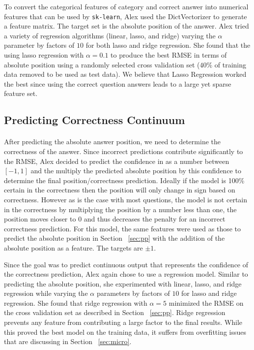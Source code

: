 \documentclass[letterpaper]{article}
\begin{document}
To convert the categorical features of category and correct answer into numerical features that can be used by \lstinline{sk-learn}, Alex used the DictVectorizer to generate a feature matrix.  The target set is the absolute position of the answer.  Alex tried a variety of regression algorithms (linear, lasso, and ridge) varying the $\alpha$ parameter by factors of $10$ for both lasso and ridge regression.  She found that the using lasso regression with $\alpha=0.1$ to produce the best RMSE in terms of absolute position using a randomly selected cross validation set ($40\%$ of training data removed to be used as test data).  We believe that Lasso Regression worked the best since using the correct question answers leads to a large yet sparse feature set.

\subsection{Predicting Correctness Continuum}
\label{sec:pc}
\paragraph{} After predicting the absolute answer position, we need to determine the correctness of the answer.  Since incorrect predictions contribute significantly to the RMSE, Alex decided to predict the confidence in as a number between $[-1,1]$ and the multiply the predicted absolute position by this confidence to determine the final position/correctness prediction.  Ideally if the model is 100\% certain in the correctness then the position will only change in sign based on correctness.  However as is the case with most questions, the model is not certain in the correctness by multiplying the position by a number less than one, the position moves closer to 0 and thus decreases the penalty for an incorrect correctness prediction.  For this model, the same features were used as those to predict the absolute position in Section ~\ref{sec:pp} with the addition of the absolute position as a feature.  The targets are $\pm 1$.

Since the goal was to predict continuous output that represents the confidence of the correctness prediction, Alex again chose to use a regression model.  Similar to predicting the absolute position, she experimented with linear, lasso, and ridge regression while varying the $\alpha$ parameters by factors of $10$ for lasso and ridge regression.  She found that ridge regression with $\alpha=5$ minimized the RMSE on the cross validation set as described in Section ~\ref{sec:pp}.  Ridge regression prevents any feature from contributing a large factor to the final results.  While this proved the best model on the training data, it suffers from overfitting issues that are discussing in Section ~\ref{sec:micro}.
\end{document}
